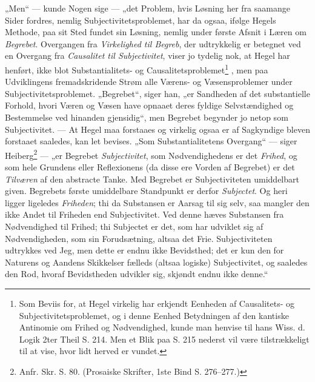 \documentclass[11pt]{book}
\newcommand{\opage}[1]{\marginnote{\footnotesize\textit{[#1]}}}
\begin{document}
„Men“ --- kunde Nogen sige --- „det Problem, hvis Løsning her fra saamange
Sider fordres, nemlig Subjectivitetsproblemet, har da ogsaa, ifølge Hegels
Methode, paa sit Sted fundet sin Løsning, nemlig under første Afsnit i
Læren om \emph{Begrebet}. Overgangen fra \emph{Virkelighed til Begreb},
der udtrykkelig er betegnet ved en Overgang fra \emph{Causalitet til
Subjectivitet}, viser jo tydelig nok, at Hegel har henført, ikke blot
Substantialitets- og Causalitetsproblemet\footnote{Som Beviis for, at Hegel
virkelig har erkjendt Eenheden af Causalitets- og Subjectivitetsproblemet,
og i denne Eenhed Betydningen af den kantiske Antinomie om Frihed og
Nødvendighed, kunde man henvise til hans Wiss. d. Logik 2ter Theil S. 214.
Men et Blik paa S. 215 nederst vil være tilstrækkeligt til at vise, hvor
lidt herved er vundet.}%
, men paa
\opage{140} \setcounter{footnote}{0}%
Udviklingens fremadskridende Strøm alle Værens- og Væsensproblemer under
Subjectivitetsproblemet. „Begrebet“, siger han, „er Sandheden af det
substantielle Forhold, hvori Væren og Væsen have opnaaet deres fyldige
Selvstændighed og Bestemmelse ved hinanden gjensidig“, men Begrebet
begynder jo netop som Subjectivitet. --- At Hegel maa forstaaes og
virkelig ogsaa er af Sagkyndige bleven forstaaet saaledes, kan let bevises.
„Som Substantialitetens Overgang“ --- siger Heiberg\footnote{Anfr. Skr. S.
80. (Prosaiske Skrifter, 1ste Bind S. 276--277.)}
--- „er Begrebet \emph{Subjectivitet}, som Nødvendighedens er det
\emph{Frihed}, og som hele Grundens eller Reflexionens (da disse ere
Vorden af Begrebet) er det \emph{Tilværen} af den abstracte Tanke. Med
Begrebet er Subjectiviteten umiddelbart given. Begrebets første
umiddelbare Standpunkt er derfor \emph{Subjectet}. Og heri ligger
ligeledes \emph{Friheden}; thi da Substansen er Aarsag til sig selv, saa
mangler den ikke Andet til Friheden end Subjectivitet. Ved denne hæves
Substansen fra Nødvendighed til Frihed; thi Subjectet er det, som har
udviklet sig af Nødvendigheden, som sin Forudsætning, altsaa det Frie.
Subjectiviteten udtrykkes ved Jeg, men dette er endnu ikke Bevidsthed; det
er kun den for Naturens og Aandens Skikkelser fælleds (altsaa logiske)
Subjectivitet, og saaledes den Rod, hvoraf Bevidstheden udvikler sig,
skjøndt endnu ikke denne.“%
\end{document}
